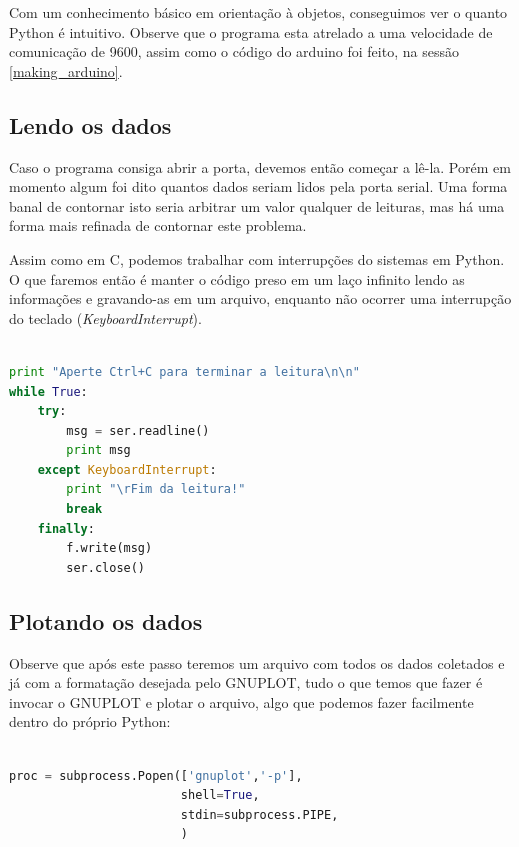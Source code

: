 \begin{multicols}{2}
\begin{lstlisting}[basicstyle=\ttfamily,language=Python,numbers=none,caption={[Acessando a porta serial]Acessando a porta serial}]
\end{lstlisting}
Com um conhecimento básico em orientação à objetos, conseguimos ver o quanto Python é intuitivo. Observe que o programa esta atrelado a uma velocidade de comunicação de 9600, assim como o código do arduino foi feito, na sessão \ref{making_arduino}.

\subsection{Lendo os dados}\label{reading}


Caso o programa consiga abrir a porta, devemos então começar a lê-la. Porém em momento algum foi dito quantos dados seriam lidos pela porta serial. Uma forma banal de contornar isto seria arbitrar um valor qualquer de leituras, mas há uma forma mais refinada de contornar este problema.

Assim como em C, podemos trabalhar com interrupções do sistemas em Python. O que faremos então é manter o código preso em um laço infinito lendo as informações e gravando-as em um arquivo, enquanto não ocorrer uma interrupção do teclado (\textit{KeyboardInterrupt}).

\begin{lstlisting}[basicstyle=\ttfamily,language=Python,numbers=none,caption={[Lendo dados]Lendo dados ininterruptamente}]

print "Aperte Ctrl+C para terminar a leitura\n\n"
while True:
	try:
		msg = ser.readline()
		print msg 
	except KeyboardInterrupt:
		print "\rFim da leitura!"
		break	
	finally:
		f.write(msg)
		ser.close()

\end{lstlisting}

\subsection{Plotando os dados}\label{plotting}


Observe que após este passo teremos um arquivo com todos os dados coletados e já com a formatação desejada pelo GNUPLOT, tudo o que temos que fazer é invocar o GNUPLOT e plotar o arquivo, algo que podemos fazer facilmente dentro do próprio Python:

\begin{lstlisting}[basicstyle=\ttfamily,language=Python,numbers=none,caption={[Plotando os dados]Plotando os dados através do Python}]

proc = subprocess.Popen(['gnuplot','-p'], 
                        shell=True,
                        stdin=subprocess.PIPE,
                        )
                        

\end{lstlisting}
\end{multicols}
